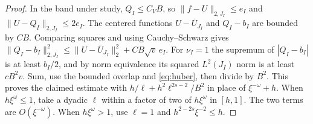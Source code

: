 \begin{proof}
In the band under study, \(Q_I\le C_VB\), so
\(\|f-U\|_{2,J_I}\le e_I\) and \(\|U-Q_I\|_{2,J_I}\le2e_I\).
The centered functions \(U-\overline U_{J_I}\) and \(Q_I-b_I\)
are bounded by \(CB\). Comparing squares and using
Cauchy--Schwarz gives
\(\|Q_I-b_I\|_{2,J_I}^2\le
\|U-\overline U_{J_I}\|_2^2+CB\sqrt v\,e_I\).
For \(\nu_I=1\) the supremum of \(|Q_I-b_I|\) is at least
\(b_I/2\), and by norm equivalence its squared \(L^2(J_I)\)
norm is at least \(cB^2 v\). Sum, use the bounded overlap
and \eqref{eq:huber}, then divide by \(B^2\). This proves the
claimed estimate with \(h/\ell+h^2\ell^{2s-2}/B^2\)
in place of \(\xi^{-\omega}+h\). When \(h\xi^\omega\le1\),
take a dyadic \(\ell\) within a factor of two of \(h\xi^\omega\)
in \([h,1]\). The two terms are \(O(\xi^{-\omega})\).
When \(h\xi^\omega>1\), use \(\ell=1\) and
\(h^{2-2s}\xi^{-2}\le h\).
\end{proof}
